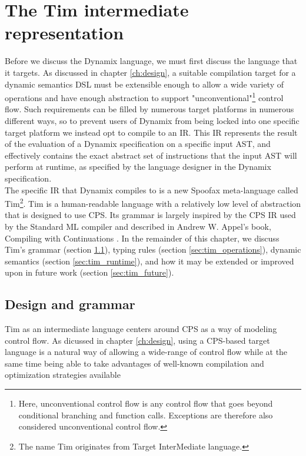 
\chapter{\label{ch:tim}The Tim intermediate representation}

Before we discuss the Dynamix language, we must first discuss the language that it targets. As discussed in chapter \ref{ch:design}, a suitable compilation target for a dynamic semantics \ac{DSL} must be extensible enough to allow a wide variety of operations and have enough abstraction to support "unconventional"\footnote{Here, unconventional control flow is any control flow that goes beyond conditional branching and function calls. Exceptions are therefore also considered unconventional control flow.} control flow. Such requirements can be filled by numerous target platforms in numerous different ways, so to prevent users of Dynamix from being locked into one specific target platform we instead opt to compile to an \acf{IR}. This \ac{IR} represents the result of the evaluation of a Dynamix specification on a specific input \ac{AST}, and effectively contains the exact abstract set of instructions that the input \ac{AST} will perform at runtime, as specified by the language designer in the Dynamix specification.\\

The specific \ac{IR} that Dynamix compiles to is a new Spoofax meta-language called Tim\footnote{The name Tim originates from Target InterMediate language.}. Tim is a human-readable language with a relatively low level of abstraction that is designed to use \acf{CPS}. Its grammar is largely inspired by the \ac{CPS} \ac{IR} used by the Standard ML compiler and described in Andrew W. Appel's book, Compiling with Continuations \cite{Appel1992}. In the remainder of this chapter, we discuss Tim's grammar (section \ref{sec:tim_grammar}), typing rules (section \ref{sec:tim_operations}), dynamic semantics (section \ref{sec:tim_runtime}), and how it may be extended or improved upon in future work (section \ref{sec:tim_future}).

\section{Design and grammar}
\label{sec:tim_grammar}

Tim as an intermediate language centers around \acf{CPS} as a way of modeling control flow. As dicussed in chapter \ref{ch:design}, using a \ac{CPS}-based target language is a natural way of allowing a wide-range of control flow while at the same time being able to take advantages of well-known compilation and optimization strategies available

